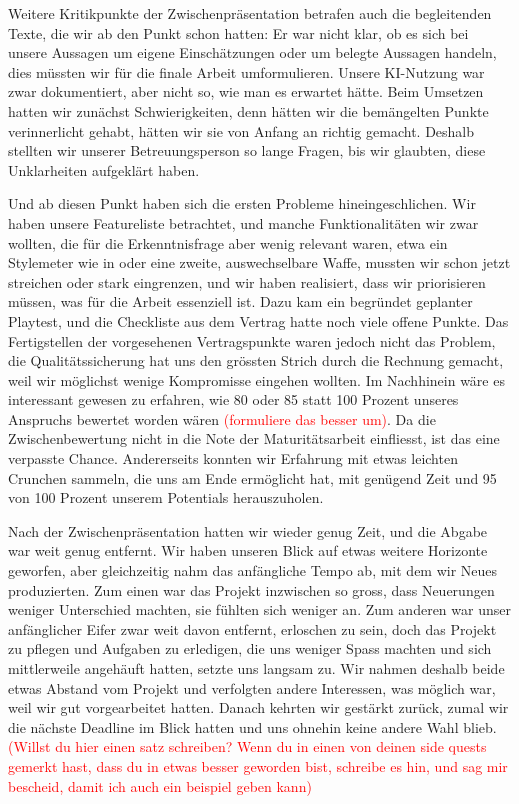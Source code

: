 \documentclass[../Main.tex]{subfiles}
\begin{document}
Weitere Kritikpunkte der Zwischenpräsentation betrafen auch die begleitenden Texte, die wir ab den Punkt schon hatten: Er war nicht klar, ob es sich bei unsere Aussagen um eigene Einschätzungen oder um belegte Aussagen handeln, dies müssten wir für die finale Arbeit umformulieren. Unsere KI-Nutzung war zwar dokumentiert, aber nicht so, wie man es erwartet hätte. Beim Umsetzen hatten wir zunächst Schwierigkeiten, denn hätten wir die bemängelten Punkte verinnerlicht gehabt, hätten wir sie von Anfang an richtig gemacht. Deshalb stellten wir unserer Betreuungsperson so lange Fragen, bis wir glaubten, diese Unklarheiten aufgeklärt haben.

Und ab diesen Punkt haben sich die ersten Probleme hineingeschlichen. Wir haben unsere Featureliste betrachtet, und manche Funktionalitäten wir zwar wollten, die für die Erkenntnisfrage aber wenig relevant waren, etwa ein Stylemeter wie in \autocite{capcom_devilmaycry_2001} oder eine zweite, auswechselbare Waffe, mussten wir schon jetzt streichen oder stark eingrenzen, und wir haben realisiert, dass wir priorisieren müssen, was für die Arbeit essenziell ist. Dazu kam ein begründet geplanter Playtest, und die Checkliste aus dem Vertrag hatte noch viele offene Punkte. Das Fertigstellen der vorgesehenen Vertragspunkte waren jedoch nicht das Problem, die Qualitätssicherung hat uns den grössten Strich durch die Rechnung gemacht, weil wir möglichst wenige Kompromisse eingehen wollten. Im Nachhinein wäre es interessant gewesen zu erfahren, wie 80 oder 85 statt 100 Prozent unseres Anspruchs bewertet worden wären \textcolor{red}{(formuliere das besser um)}. Da die Zwischenbewertung nicht in die Note der Maturitätsarbeit einfliesst, ist das eine verpasste Chance. Andererseits konnten wir Erfahrung mit etwas leichten Crunchen sammeln, die uns am Ende ermöglicht hat, mit genügend Zeit und 95 von 100 Prozent unserem Potentials herauszuholen.

Nach der Zwischenpräsentation hatten wir wieder genug Zeit, und die Abgabe war weit genug entfernt. Wir haben unseren Blick auf etwas weitere Horizonte geworfen, aber gleichzeitig nahm das anfängliche Tempo ab, mit dem wir Neues produzierten. Zum einen war das Projekt inzwischen so gross, dass Neuerungen weniger Unterschied machten, sie fühlten sich weniger an. Zum anderen war unser anfänglicher Eifer zwar weit davon entfernt, erloschen zu sein, doch das Projekt zu pflegen und Aufgaben zu erledigen, die uns weniger Spass machten und sich mittlerweile angehäuft hatten, setzte uns langsam zu. Wir nahmen deshalb beide etwas Abstand vom Projekt und verfolgten andere Interessen, was möglich war, weil wir gut vorgearbeitet hatten. Danach kehrten wir gestärkt zurück, zumal wir die nächste Deadline im Blick hatten und uns ohnehin keine andere Wahl blieb. \textcolor{red}{(Willst du hier einen satz schreiben? Wenn du in einen von deinen side quests gemerkt hast, dass du in etwas besser geworden bist, schreibe es hin, und sag mir bescheid, damit ich auch ein beispiel geben kann)}
\end{document}
